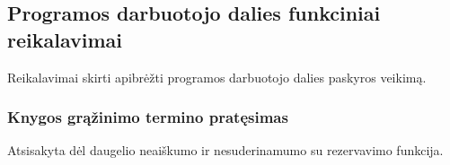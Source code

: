 \documentclass{VUMIFPSkursinis}
\begin{document}
 \subsection{Programos darbuotojo dalies funkciniai reikalavimai}
 Reikalavimai skirti apibrėžti programos darbuotojo dalies paskyros veikimą. 
 
 \subsubsection{Knygos grąžinimo termino pratęsimas}
 \noindent
 Atsisakyta dėl daugelio neaiškumo ir nesuderinamumo su rezervavimo funkcija. %

 
\end{document}
